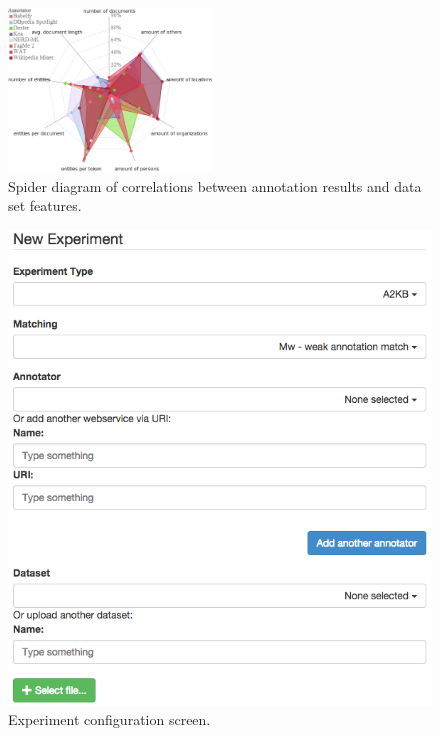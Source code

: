 \begin{figure}[htb]
\centering
\includegraphics[width=0.48\textwidth]{chapter_three/benchmarking/ESWC_GERBIL_demo/correlations.pdf}
\caption{Spider diagram of correlations between annotation results and data set features.}
\label{cha333:fig:spiderfeature}
\end{figure}


\begin{figure}
\centering
\includegraphics[width=0.95\linewidth]{chapter_three/benchmarking/ESWC_GERBIL_demo/screenshot}
\caption{Experiment configuration screen.}
\label{cha333:fig:screenshot}
\end{figure}

